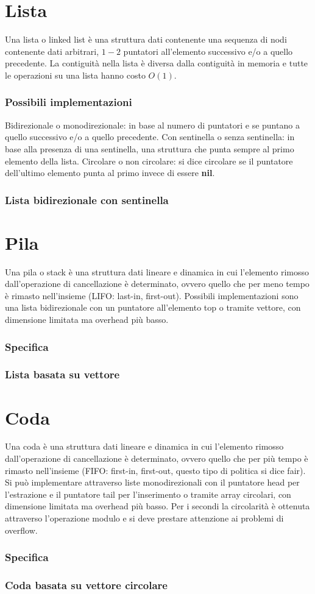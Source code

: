 \section{Lista}
Una lista o linked list \`e una struttura dati contenente una sequenza di nodi contenente dati arbitrari, $1-2$ puntatori all'elemento successivo e/o a
quello precedente. La contiguit\`a nella lista \`e diversa dalla contiguit\`a in memoria e tutte le operazioni su una lista hanno costo $O(1)$.
\subsubsection{Possibili implementazioni}
Bidirezionale o monodirezionale: in base al numero di puntatori e se puntano a quello successivo e/o a quello precedente.
Con sentinella o senza sentinella: in base alla presenza di una sentinella, una struttura che punta sempre al primo elemento della lista.
Circolare o non circolare: si dice circolare se il puntatore dell'ultimo elemento punta al primo invece di essere \textbf{nil}.
\subsubsection{Lista bidirezionale con sentinella}

\section{Pila}
Una pila o stack \`e una struttura dati lineare e dinamica in cui l'elemento rimosso dall'operazione di cancellazione \`e determinato, ovvero quello che
per meno tempo \`e rimasto nell'insieme (LIFO: last-in, first-out). Possibili implementazioni sono una lista bidirezionale con un puntatore all'elemento
top o tramite vettore, con dimensione limitata ma overhead pi\`u basso.
\subsubsection{Specifica}

\subsubsection{Lista basata su vettore}

\section{Coda}
Una coda \`e una struttura dati lineare e dinamica in cui l'elemento rimosso dall'operazione di cancellazione \`e determinato, ovvero quello che per pi\`u
tempo \`e rimasto nell'insieme (FIFO: first-in, first-out, questo tipo di politica si dice fair). Si pu\`o implementare attraverso liste monodirezionali
con il puntatore head per l'estrazione e il puntatore tail per l'inserimento o tramite array circolari, con dimensione limitata ma overhead pi\`u basso.
Per i secondi la circolarit\`a \`e ottenuta attraverso l'operazione modulo e si deve prestare attenzione ai problemi di overflow.
\subsubsection{Specifica}

\subsubsection{Coda basata su vettore circolare}


